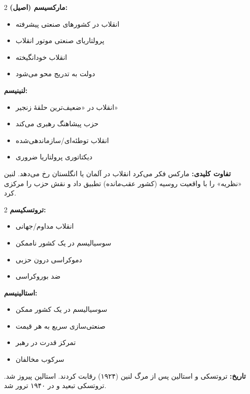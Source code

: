 \begin{tcolorbox}[
    enhanced,
    colback=leftred!5,
    colframe=leftred,
    boxrule=1.5pt,
    arc=5pt,
    fonttitle=\bfseries,
    title={\rl{🔴 مارکسیسم در برابر لنینیسم}}
]
\begin{multicols}{2}
\textbf{مارکسیسم (اصیل):}
\begin{itemize}
    \item انقلاب در کشورهای صنعتی پیشرفته
    \item پرولتاریای صنعتی موتور انقلاب
    \item انقلاب خودانگیخته
    \item دولت به تدریج محو می‌شود
\end{itemize}

\columnbreak

\textbf{لنینیسم:}
\begin{itemize}
    \item انقلاب در «ضعیف‌ترین حلقهٔ زنجیر»
    \item حزب پیشاهنگ رهبری می‌کند
    \item انقلاب توطئه‌ای/سازماندهی‌شده
    \item دیکتاتوری پرولتاریا ضروری
\end{itemize}
\end{multicols}

\textbf{تفاوت کلیدی:} مارکس فکر می‌کرد انقلاب در آلمان یا انگلستان رخ می‌دهد. لنین «نظریه» را با واقعیت روسیه (کشور عقب‌مانده) تطبیق داد و نقش حزب را مرکزی کرد.
\end{tcolorbox}

\begin{tcolorbox}[
    enhanced,
    colback=leftred!5,
    colframe=leftred,
    boxrule=1.5pt,
    arc=5pt,
    fonttitle=\bfseries,
    title={\rl{🔴 تروتسکیسم در برابر استالینیسم}}
]
\begin{multicols}{2}
\textbf{تروتسکیسم:}
\begin{itemize}
    \item انقلاب مداوم/جهانی
    \item سوسیالیسم در یک کشور ناممکن
    \item دموکراسی درون حزبی
    \item ضد بوروکراسی
\end{itemize}

\columnbreak

\textbf{استالینیسم:}
\begin{itemize}
    \item سوسیالیسم در یک کشور ممکن
    \item صنعتی‌سازی سریع به هر قیمت
    \item تمرکز قدرت در رهبر
    \item سرکوب مخالفان
\end{itemize}
\end{multicols}

\textbf{تاریخ:} تروتسکی و استالین پس از مرگ لنین (۱۹۲۴) رقابت کردند. استالین پیروز شد. تروتسکی تبعید و در ۱۹۴۰ ترور شد.
\end{tcolorbox}

